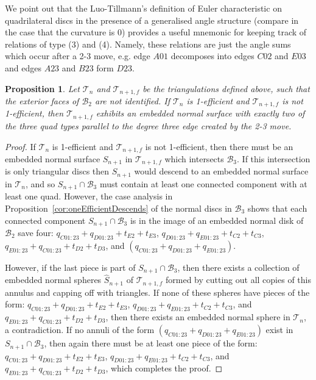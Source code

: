 \documentclass[12pt,reqno]{amsart}  %
\newtheorem{prop}[thm]{Proposition}
\theoremstyle{definition}
\theoremstyle{remark}
\newcommand{\T}{\mathcal{T}}
\def\BTwo{\mathcal{B}_2}
\def\BThree{\mathcal{B}_3}
\begin{document}
We point out that the Luo-Tillmann's definition of Euler characteristic 
on quadrilateral discs in the presence of a generalised angle structure 
(compare  \cite[Lemma 15]{LT} in the case that the curvature is 0) provides 
a useful mnemonic for keeping track of relations of type (3) and (4). 
Namely, these relations are just the angle sums which occur after a 
2-3 move, e.g. edge $A01$ decomposes into edges $C02$ and $E03$ and 
edges $A23$ and $B23$ form $D23$.

\begin{prop}
\label{prop:oneEfficientFails}
Let $\T_n$ and $\T_{n+1,f}$ be the triangulations defined above, such that 
the exterior faces of $\BTwo$ are not identified.
If $\T_n$ is 1-efficient and $\T_{n+1,f}$ is not 1-efficient, then 
$\T_{n+1,f}$ exhibits an embedded normal surface with exactly two of the 
three quad types parallel to the degree three edge created by the 2-3 move.  
\end{prop}

\begin{proof}
If $\T_n$ is 1-efficient and $\T_{n+1,f}$ is not 1-efficient, then there 
must be an embedded normal surface $S_{n+1}$ in $\T_{n+1,f}$ which 
intersects  $\BThree$. If this intersection is only triangular discs then 
$S_{n+1}$ would descend to an embedded normal surface in $\T_n$, and so 
$S_{n+1}\cap \BThree$ must contain at least one connected component with at 
least one quad.  However, the case analysis in 
Proposition~\ref{cor:oneEfficientDescends} of the normal discs in 
$\BThree$ shows that each connected component $S_{n+1}\cap \BThree$ is in 
the image of an embedded normal disk of $\BTwo$ save four: 
$q_{C01:23}+q_{D01:23}+t_{E2}+t_{E3}$,
$q_{D01:23}+q_{E01:23}+t_{C2}+t_{C3}$, 
$q_{E01:23}+q_{C01:23}+t_{D2}+t_{D3}$,
and $(q_{C01:23}+q_{D01:23}+q_{E01:23})$.
 
However, if the last piece is part of $S_{n+1}\cap \BThree$, then there 
exists a collection of embedded normal spheres $\hat{S}_{n+1}$ of 
$\T_{n+1,f}$ formed by cutting out all copies of this annulus and capping 
off with triangles. If none of these spheres have pieces of the form:
$q_{C01:23}+q_{D01:23}+t_{E2}+t_{E3}$,
$q_{D01:23}+q_{E01:23}+t_{C2}+t_{C3}$, and 
$q_{E01:23}+q_{C01:23}+t_{D2}+t_{D3}$,
then there exists an embedded normal sphere in $\T_n$, a contradiction. 
If no annuli of the form $(q_{C01:23}+q_{D01:23}+q_{E01:23})$ exist in 
$S_{n+1}\cap \BThree$, then again there must be at least one piece of the form: 
$q_{C01:23}+q_{D01:23}+t_{E2}+t_{E3}$,
$q_{D01:23}+q_{E01:23}+t_{C2}+t_{C3}$, and 
$q_{E01:23}+q_{C01:23}+t_{D2}+t_{D3}$, which completes the proof.
\end{proof}
\end{document}
